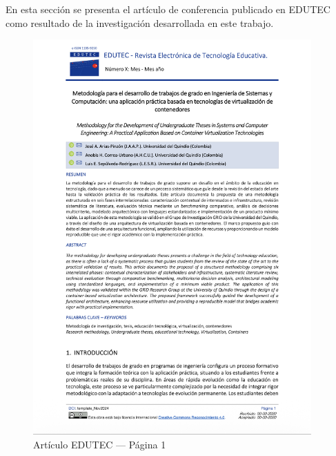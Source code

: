 En esta sección se presenta el artículo de conferencia publicado en EDUTEC como resultado de la investigación desarrollada en este trabajo.

\begin{figure}[H]
    \centering
    \begin{tcolorbox}[
        colback=white,
        colframe=gray!50,
        boxrule=1pt,
        arc=2pt,
        boxsep=5pt,
        left=3pt,
        right=3pt,
        top=3pt,
        bottom=3pt,
        drop shadow
    ]
        \includegraphics[width=0.95\textwidth,keepaspectratio]{apendices/EDUTEC/1.png}
    \end{tcolorbox}
    \caption{Artículo EDUTEC --- Página 1}\label{fig:edutec-pagina-1}
\end{figure}
\FloatBarrier

